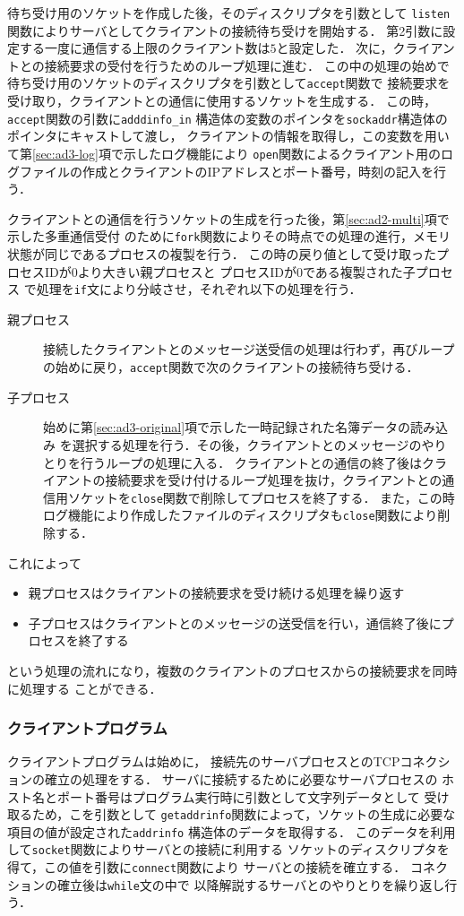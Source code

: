 待ち受け用のソケットを作成した後，そのディスクリプタを引数として
\verb|listen|関数によりサーバとしてクライアントの接続待ち受けを開始する．
第2引数に設定する一度に通信する上限のクライアント数は$5$と設定した．
次に，クライアントとの接続要求の受付を行うためのループ処理に進む．
この中の処理の始めで待ち受け用のソケットのディスクリプタを引数として\verb|accept|関数で
接続要求を受け取り，クライアントとの通信に使用するソケットを生成する．
この時，\verb|accept|関数の引数に\verb|adddinfo_in|
構造体の変数のポインタを\verb|sockaddr|構造体のポインタにキャストして渡し，
クライアントの情報を取得し，この変数を用いて第\ref{sec:ad3-log}項で示したログ機能により
\verb|open|関数によるクライアント用のログファイルの作成とクライアントのIPアドレスとポート番号，時刻の記入を行う．


クライアントとの通信を行うソケットの生成を行った後，第\ref{sec:ad2-multi}項で示した多重通信受付
のために\verb|fork|関数によりその時点での処理の進行，メモリ状態が同じであるプロセスの複製を行う．
この時の戻り値として受け取ったプロセスIDが0より大きい親プロセスと
プロセスIDが0である複製された子プロセス
で処理を\verb|if|文により分岐させ，それぞれ以下の処理を行う．
\begin{description}
  \item[親プロセス] 接続したクライアントとのメッセージ送受信の処理は行わず，再びループの始めに戻り，\verb|accept|関数で次のクライアントの接続待ち受ける．
  \item[子プロセス] 始めに第\ref{sec:ad3-original}項で示した一時記録された名簿データの読み込み
  を選択する処理を行う．その後，クライアントとのメッセージのやりとりを行うループの処理に入る．
  クライアントとの通信の終了後はクライアントの接続要求を受け付けるループ処理を抜け，クライアントとの通信用ソケットを\verb|close|関数で削除してプロセスを終了する．
  また，この時ログ機能により作成したファイルのディスクリプタも\verb|close|関数により削除する．
\end{description}
これによって
\begin{itemize}
  \item 親プロセスはクライアントの接続要求を受け続ける処理を繰り返す
  \item 子プロセスはクライアントとのメッセージの送受信を行い，通信終了後にプロセスを終了する
\end{itemize}
という処理の流れになり，複数のクライアントのプロセスからの接続要求を同時に処理する
ことができる．

\subsubsection{クライアントプログラム}
クライアントプログラムは始めに，
接続先のサーバプロセスとのTCPコネクションの確立の処理をする．
サーバに接続するために必要なサーバプロセスの
ホスト名とポート番号はプログラム実行時に引数として文字列データとして
受け取るため，こを引数として
\verb|getaddrinfo|関数によって，ソケットの生成に必要な項目の値が設定された\verb|addrinfo|
構造体のデータを取得する．
このデータを利用して\verb|socket|関数によりサーバとの接続に利用する
ソケットのディスクリプタを得て，この値を引数に\verb|connect|関数により
サーバとの接続を確立する．
コネクションの確立後は\verb|while|文の中で
以降解説するサーバとのやりとりを繰り返し行う．


